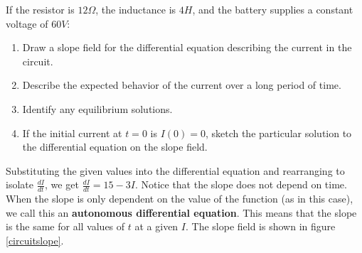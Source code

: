 \begin{Worked}
\begin{Problem}
If the resistor is $12 \Omega$, the inductance is $4H$, and 
the battery supplies a constant voltage of $60V$:
\begin{enumerate}
\item Draw a slope field for the differential equation describing the current 
in the circuit.
\item Describe the expected behavior of the current over a long period of time.
\item Identify any equilibrium solutions.
\item If the initial current at $t = 0$ is $I(0) = 0$, sketch the particular 
solution to the differential equation on the slope field. 
\end{enumerate}
\end{Problem}
\begin{Solution}
Substituting the given values into the differential 
equation and rearranging to isolate $\frac{dI}{dt}$, we get $\frac{dI}{dt} = 
15 - 3I$. Notice that the slope does not depend on time. When the slope is 
only dependent on the value of the function (as in this case), we call this an 
\textbf{autonomous differential equation}.  This means that the slope is the same for all values of $t$ at 
a given $I$. The slope field is shown in figure \ref{circuitslope}. 

\begin{figure}[H]
\centering
\end{figure}
\end{Solution}
\end{Worked}

